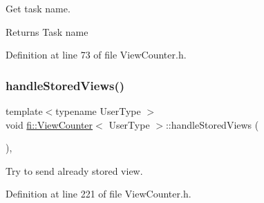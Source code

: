 Get task name. 

\begin{DoxyReturn}{Returns}
Task name 
\end{DoxyReturn}


Definition at line 73 of file View\+Counter.\+h.

\mbox{\label{classfi_1_1ViewCounter_a6941e894f768fe1f0deb1b7ff771e2bc}} 
\subsubsection{\texorpdfstring{handle\+Stored\+Views()}{handleStoredViews()}}
{\footnotesize\ttfamily template$<$typename User\+Type $>$ \\
void \hyperlink{classfi_1_1ViewCounter}{fi\+::\+View\+Counter}$<$ User\+Type $>$\+::handle\+Stored\+Views (\begin{DoxyParamCaption}{ }\end{DoxyParamCaption})\hspace{0.3cm}{\ttfamily [inline]}, {\ttfamily [private]}}



Try to send already stored view. 



Definition at line 221 of file View\+Counter.\+h.

